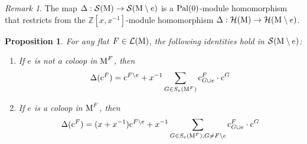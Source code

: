 \documentclass[11pt]{article}
\newcommand{\calH}{\mathcal{H}}
\newcommand{\calS}{\mathcal{S}}
\newcommand{\M}{\normalfont\text{M}}
\newcommand{\ZZ}{\mathbb{Z}}
\newcommand{\Cbasis}[1]{\mathrm{c}^{#1}}
\newcommand{\CbasisSub}[2]{\mathrm{c}^{#1}_{#2}}
\newcommand{\pal}{\normalfont\text{Pal}}
\newtheorem{proposition}[theorem]{Proposition}
\theoremstyle{remark}
\newtheorem*{remark}{Remark} %
\begin{document}
\begin{remark}
    The map \(\Delta : \calS(\M) \to \calS(\M \setminus e)\) is a \(\pal(0)\)-module homomorphism that
    restricts from the \(\ZZ[x, x^{-1}]\)-module homomorphism \(\Delta : \calH(\M) \to \calH(\M \setminus e)\).
\end{remark}

\begin{proposition}\label{prop:imageofDeltaCbasis}
    For any flat \(F \in \mathcal{L}(\M)\), the following identities hold in \(\calS(\M \setminus e)\):
    \begin{enumerate}
        \item If \(e\) is not a coloop in \(\M^F\), then
              \begin{equation}\label{eq:imageofDeltaCbasisnoncoloop}
                  \Delta(\Cbasis{F}) = \Cbasis{F \setminus e} + x^{-1}\sum_{G \in S_e(\M^F)}\CbasisSub{F}{G\cup e} \cdot \Cbasis{G}
              \end{equation}
        \item If \(e\) is a coloop in \(\M^F\), then
              \begin{equation}\label{eq:imageofDeltaCbasiscoloop}
                  \Delta(\Cbasis{F}) = (x+x^{-1})\Cbasis{F \setminus e} + x^{-1}\sum_{G \in S_e(\M^F), G \neq F\setminus e}\CbasisSub{F}{G\cup e} \cdot \Cbasis{G}
              \end{equation}
    \end{enumerate}
\end{proposition}
\end{document}
